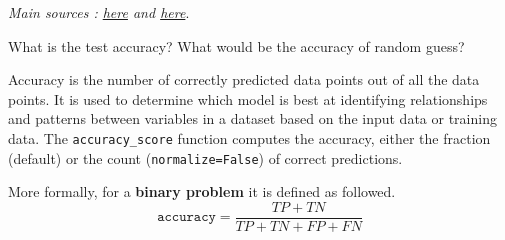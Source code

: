 \documentclass[10pt,a4paper]{article}
\theoremstyle{break}
\begin{document}
\emph{Main sources : \href{https://medium.com/@paritoshkumar_5426/time-complexity-of-ml-models-4ec39fad2770}{here} and \href{https://www.thekerneltrip.com/machine/learning/computational-complexity-learning-algorithms/}{here}}.

\begin{tcolorbox}

What is the test accuracy? What would be the accuracy of random guess?

\end{tcolorbox}

Accuracy is the number of correctly predicted data points out of all the data points. It is used to determine which model is best at identifying relationships and patterns between variables in a dataset based on the input data or training data. The \texttt{accuracy\_score} function computes the accuracy, either the fraction (default) or the count (\texttt{normalize=False}) of correct predictions.

More formally, for a \textbf{binary problem} it is defined as followed.
\[
\texttt{accuracy} = \frac{TP + TN}{TP + TN + FP + FN}
\]
\end{document}
